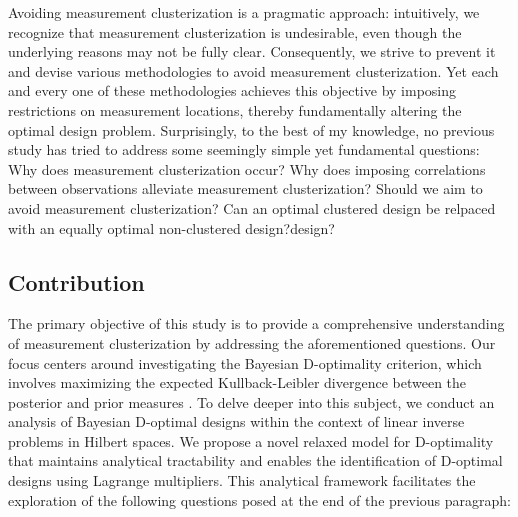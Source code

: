 Avoiding measurement clusterization is a pragmatic approach:
intuitively, we recognize that measurement clusterization is
undesirable, even though the underlying reasons may not be fully
clear. Consequently, we strive to prevent it and devise various
methodologies to avoid measurement clusterization. Yet each and every
one of these methodologies achieves this objective by imposing
restrictions on measurement locations, thereby fundamentally altering
the optimal design problem. Surprisingly, to the best of my knowledge,
no previous study has tried to address some seemingly simple yet
fundamental questions:
%
Why does measurement clusterization occur?
%
Why does imposing correlations between observations alleviate
measurement clusterization?
%
Should we aim to avoid measurement clusterization?
%
Can an optimal clustered design be relpaced with an equally optimal
non-clustered design?design?


\subsection{Contribution}
The primary objective of this study is to provide a comprehensive
understanding of measurement clusterization by addressing the
aforementioned questions. Our focus centers around investigating the
Bayesian D-optimality criterion, which involves maximizing the
expected Kullback-Leibler divergence between the posterior and prior
measures \cite{CoverThomas91, Chaloner1995}. To delve deeper into this
subject, we conduct an analysis of Bayesian D-optimal designs within
the context of linear inverse problems in Hilbert spaces. We propose a
novel relaxed model for D-optimality that maintains analytical
tractability and enables the identification of D-optimal designs using
Lagrange multipliers. This analytical framework facilitates the
exploration of the following questions posed at the end of the
previous paragraph:


